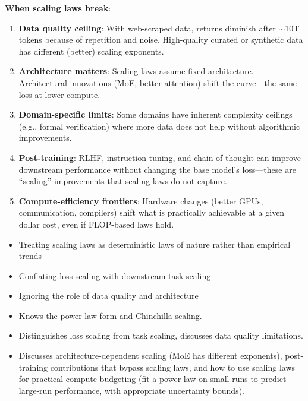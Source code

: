 \begin{interviewq}
\textbf{When scaling laws break}:
\begin{enumerate}
    \item \textbf{Data quality ceiling}: With web-scraped data, returns diminish after $\sim$10T tokens because of repetition and noise. High-quality curated or synthetic data has different (better) scaling exponents.
    \item \textbf{Architecture matters}: Scaling laws assume fixed architecture. Architectural innovations (MoE, better attention) shift the curve---the same loss at lower compute.
    \item \textbf{Domain-specific limits}: Some domains have inherent complexity ceilings (e.g., formal verification) where more data does not help without algorithmic improvements.
    \item \textbf{Post-training}: RLHF, instruction tuning, and chain-of-thought can improve downstream performance without changing the base model's loss---these are ``scaling'' improvements that scaling laws do not capture.
    \item \textbf{Compute-efficiency frontiers}: Hardware changes (better GPUs, communication, compilers) shift what is practically achievable at a given dollar cost, even if FLOP-based laws hold.
\end{enumerate}

\redflags
\begin{itemize}
    \item Treating scaling laws as deterministic laws of nature rather than empirical trends
    \item Conflating loss scaling with downstream task scaling
    \item Ignoring the role of data quality and architecture
\end{itemize}


\goodgreat
\begin{itemize}
    \item {} Knows the power law form and Chinchilla scaling.
    \item {} Distinguishes loss scaling from task scaling, discusses data quality limitations.
    \item {} Discusses architecture-dependent scaling (MoE has different exponents), post-training contributions that bypass scaling laws, and how to use scaling laws for practical compute budgeting (fit a power law on small runs to predict large-run performance, with appropriate uncertainty bounds).
\end{itemize}

\end{interviewq}

